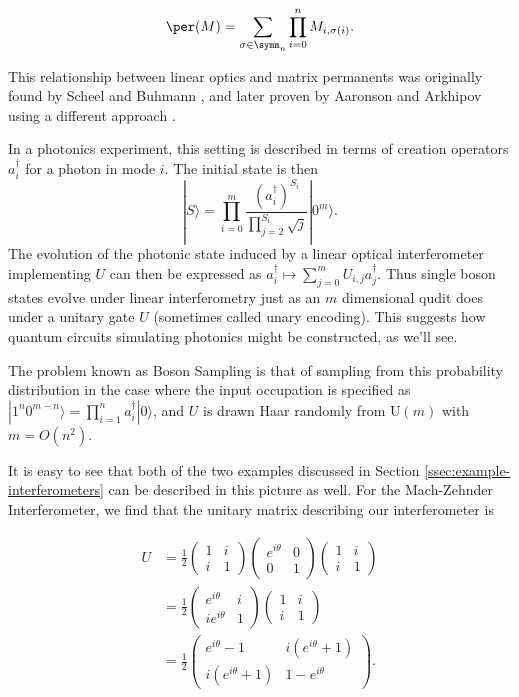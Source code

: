 \begin{equation}
\per(M) = \sum_{\sigma\in\symm_n}\prod_{i=0}^nM_{i,\sigma(i)}.
\end{equation}

This relationship between linear optics and matrix permanents was originally found by Scheel and Buhmann \cite{scheel2008}, and later proven by Aaronson and Arkhipov using a different approach \cite{aaronson2010report, aaronson2011}.

In a photonics experiment, this setting is described in terms of creation operators $a^\dag_i$ for a photon in mode $i$. 
The initial state is then
\begin{equation}
|S\rangle = \prod_{i=0}^m \frac{(a_i^\dagger)^{S_i}}{\prod_{j=2}^{S_i}\sqrt{j}}|0^m\rangle.
\end{equation}
The evolution of the photonic state induced by a linear optical interferometer implementing $U$ can then be expressed as $a_i^\dagger \mapsto \sum_{j = 0}^m U_{i,j}a_j^\dagger$.
Thus single boson states evolve under linear interferometry just as an $m$ dimensional qudit does under a unitary gate $U$ (sometimes called unary encoding).
This suggests how quantum circuits simulating photonics might be constructed, as we'll see.

The problem known as Boson Sampling is that of sampling from this probability distribution in the case where the input occupation is specified as $|1^n 0^{m - n}\rangle = \prod_{i = 1}^n a_{i}^\dagger|0\rangle$, and $U$ is drawn Haar randomly from U$(m)$ with $m=O(n^2)$\cite{aaronson2010report, aaronson2011}.

It is easy to see that both of the two examples discussed in Section \ref{ssec:example-interferometers} can be described in this picture as well. For the Mach-Zehnder Interferometer, we find that the unitary matrix describing our interferometer is

\begin{align}
U &= \frac{1}{2}\begin{pmatrix}1&i\\i&1\end{pmatrix}\begin{pmatrix}e^{i\theta}&0\\0&1\end{pmatrix}\begin{pmatrix}1&i\\i&1\end{pmatrix}\\
&= \frac{1}{2}\begin{pmatrix}e^{i\theta}&i\\ie^{i\theta}&1\end{pmatrix}\begin{pmatrix}1&i\\i&1\end{pmatrix}\\
&= \frac{1}{2}\begin{pmatrix}e^{i\theta}-1&i(e^{i\theta}+1)\\i(e^{i\theta}+1)&1-e^{i\theta}\end{pmatrix}.
\end{align}

